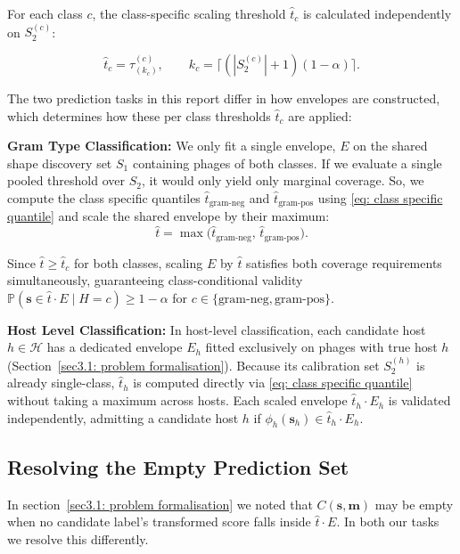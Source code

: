 For each class $c$, the class-specific scaling threshold $\hat{t}_c$ is calculated independently on $S_2^{(c)}$:

\begin{equation}
\label{eq: class specific quantile}
\hat{t}_c = \tau_{(k_c)}^{(c)}, \qquad k_c = \lceil(|S_2^{(c)}|+1)(1-\alpha)\rceil.
\end{equation}

The two prediction tasks in this report differ in how envelopes are constructed, which determines how these per 
class thresholds $\hat{t}_c$ are applied:

\textbf{Gram Type Classification: } We only fit a single envelope, $E$ on the shared shape discovery set $S_1$ 
containing phages of both classes. If we evaluate a single pooled threshold over $S_2$, it would only yield only marginal 
coverage. So, we compute the class specific quantiles $\hat{t}_{\text{gram-neg}}$ and $\hat{t}_{\text{gram-pos}}$ using 
\eqref{eq: class specific quantile} and scale the shared envelope by their maximum:
\begin{equation}
\label{eq: class conditional that gram}
\hat{t} = \max\big(\hat{t}_{\text{gram-neg}},\, \hat{t}_{\text{gram-pos}}\big).
\end{equation}

Since $\hat{t} \ge \hat{t}_c$ for both classes, scaling $E$ by $\hat{t}$ satisfies both coverage requirements 
simultaneously, guaranteeing class-conditional validity $\mathbb{P}(\mathbf{s} \in \hat{t} \cdot E \mid H = c) \ge 1-\alpha$ 
for $c \in \{\text{gram-neg}, \text{gram-pos}\}$.

\textbf{Host Level Classification: } In host-level classification, each candidate host $h \in \mathcal{H}$ has a 
dedicated envelope $E_h$ fitted exclusively on phages with true host $h$ (Section~\ref{sec3.1: problem formalisation}). 
Because its calibration set $S_2^{(h)}$ is already single-class, $\hat{t}_h$ is computed directly via \ref{eq: class 
specific quantile} without taking a maximum across hosts. Each scaled envelope $\hat{t}_h \cdot E_h$ is validated 
independently, admitting a candidate host $h$ if $\phi_h(\mathbf{s}_h) \in \hat{t}_h \cdot E_h$.



\subsection{Resolving the Empty Prediction Set}
\noindent In section~\ref{sec3.1: problem formalisation} we noted that $C(\mathbf{s},\mathbf{m})$ may be empty when no 
candidate label's transformed score falls inside $\hat t \cdot E$. In both our tasks we resolve this differently.

